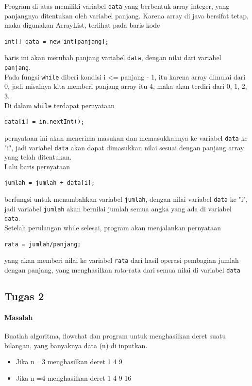 \documentclass[a4paper,12pt]{article}
\begin{document}
Program di atas memiliki variabel \texttt{data} yang berbentuk array integer, yang panjangnya ditentukan oleh variabel panjang. Karena array di java bersifat tetap, maka digunakan ArrayList, terlihat pada baris kode
\begin{lstlisting}
int[] data = new int[panjang];
\end{lstlisting}   
baris ini akan merubah panjang variabel \texttt{data}, dengan nilai dari variabel \texttt{panjang}.\\
Pada fungsi \texttt{while} diberi kondisi i <= panjang - 1, itu karena array dimulai dari 0, jadi misalnya kita memberi panjang array itu 4, maka akan terdiri dari 0, 1, 2, 3.\\
Di dalam \texttt{while} terdapat pernyataan
\begin{lstlisting}
data[i] = in.nextInt();
\end{lstlisting}
pernyataan ini akan menerima masukan dan memasukkannya ke variabel \texttt{data} ke "i", jadi variabel \texttt{data} akan dapat dimasukkan nilai sesuai dengan panjang array yang telah ditentukan.\\
Lalu baris pernyataan
\begin{lstlisting}
jumlah = jumlah + data[i];
\end{lstlisting}
berfungsi untuk menambahkan variabel \texttt{jumlah}, dengan nilai variabel \texttt{data} ke "i", jadi variabel \texttt{jumlah} akan bernilai jumlah semua angka yang ada di variabel \texttt{data}.\\
Setelah perulangan while selesai, program akan menjalankan pernyataan
\begin{lstlisting}
rata = jumlah/panjang;
\end{lstlisting}
yang akan memberi nilai ke variabel \texttt{rata} dari hasil operasi pembagian jumlah dengan panjang, yang menghasilkan rata-rata dari semua nilai di variabel \texttt{data}

\subsection{Tugas 2}
\paragraph{Masalah\\}
Buatlah algoritma, flowchat dan program untuk menghasilkan deret suatu bilangan,
yang banyaknya data (n) di inputkan.
\begin{itemize}
	\item Jika n =3 menghasilkan deret 1 4 9
	\item Jika n =4 menghasilkan deret 1 4 9 16
\end{itemize}
\end{document}
